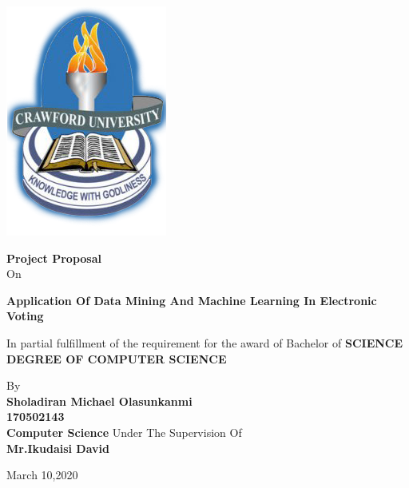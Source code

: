 \documentclass[a4paper,12pt]{report}
\begin{document}
\begin{titlepage}
\begin{center}
		\includegraphics[scale=0.7]{crawford-logo.png} \\
				\huge
			\vspace*{1cm}
		
		\textbf{Project Proposal} \\
			\vspace*{0.5cm}
			\LARGE
		On
		
\vspace*{1cm}
\LARGE
\textbf{Application Of Data Mining And Machine Learning In Electronic Voting}\\

\vspace{0.5cm}

{\Large In partial fulfillment of the requirement for the award of Bachelor of \textbf{SCIENCE DEGREE OF COMPUTER SCIENCE}}

\vspace{0.5cm}
\vfill{\Large  By\\ 
\textbf{Sholadiran Michael Olasunkanmi\\170502143\\Computer Science}}
\vspace{0.5cm}
\vfill {\Large Under The Supervision Of\\ 
\textbf{Mr.Ikudaisi David}
\vspace{0.5cm}}

{\Large March 10,2020}

\vspace{0.5cm}

\end{center}
\end{titlepage}
\end{document}
